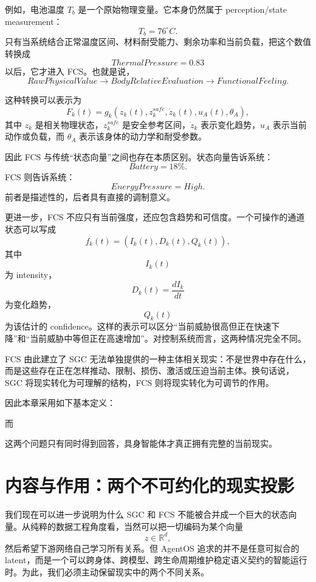 例如，电池温度 $T_b$ 是一个原始物理变量。它本身仍然属于 perception/state measurement：
\[
T_b=76^\circ C.
\]
只有当系统结合正常温度区间、材料耐受能力、剩余功率和当前负载，把这个数值转换成
\[
ThermalPressure=0.83
\]
以后，它才进入 FCS。也就是说，
\[
RawPhysicalValue
\longrightarrow
BodyRelativeEvaluation
\longrightarrow
FunctionalFeeling.
\]

这种转换可以表示为
\[
F_k(t)
=
g_k
\left(
z_k(t),
z_k^{safe},
\dot z_k(t),
u_A(t),
\theta_A
\right),
\]
其中 $z_k$ 是相关物理状态，$z_k^{safe}$ 是安全参考区间，$\dot z_k$ 表示变化趋势，$u_A$ 表示当前动作或负载，而 $\theta_A$ 表示该身体的动力学和耐受参数。

因此 FCS 与传统“状态向量”之间也存在本质区别。状态向量告诉系统：
\[
Battery=18\%.
\]
FCS 则告诉系统：
\[
EnergyPressure=High.
\]
前者是描述性的，后者具有直接的调制意义。

更进一步，FCS 不应只有当前强度，还应包含趋势和可信度。一个可操作的通道状态可以写成
\[
f_k(t)
=
\left(
I_k(t),
D_k(t),
Q_k(t)
\right),
\]
其中
\[
I_k(t)
\]
为 intensity，
\[
D_k(t)=\frac{dI_k}{dt}
\]
为变化趋势，
\[
Q_k(t)
\]
为该估计的 confidence。这样的表示可以区分“当前威胁很高但正在快速下降”和“当前威胁中等但正在高速增加”。对控制系统而言，这两种情况完全不同。

FCS 由此建立了 SGC 无法单独提供的一种主体相关现实：不是世界中存在什么，而是这些存在正在怎样推动、限制、损伤、激活或压迫当前主体。换句话说，SGC 将现实转化为可理解的结构，FCS 则将现实转化为可调节的作用。

因此本章采用如下基本定义：
\begin{statementbox}
\centering
{}
\end{statementbox}
而
\begin{statementbox}
\centering
{}
\end{statementbox}

这两个问题只有同时得到回答，具身智能体才真正拥有完整的当前现实。


\section{内容与作用：两个不可约化的现实投影}

我们现在可以进一步说明为什么 SGC 和 FCS 不能被合并成一个巨大的状态向量。从纯粹的数据工程角度看，当然可以把一切编码为某个向量
\[
z\in\mathbb R^d,
\]
然后希望下游网络自己学习所有关系。但 AgentOS 追求的并不是任意可拟合的 latent，而是一个可以跨身体、跨模型、跨生命周期维护稳定语义契约的智能运行时。为此，我们必须主动保留现实中的两个不同关系。

